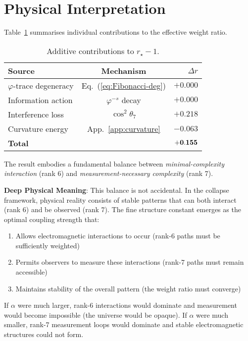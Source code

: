 \documentclass[%
 reprint,
 amsmath,amssymb,
 aps,
 prd,
 nofootinbib,      %
 longbibliography  %
]{revtex4-2}
\begin{document}
\section{Physical Interpretation}\label{sec:interpretation}

Table~\ref{tab:contributions}
summarises individual contributions to the effective
weight ratio.
\begin{table}[ht]
  \centering
  \begin{tabular}{@{}lcr@{}}
    \toprule
    Source & Mechanism & $\Delta r$ \\
    \midrule
    $\varphi$-trace degeneracy & Eq.~(\ref{eq:Fibonacci-deg}) & $+0.000$ \\
    Information action & $\varphi^{-s}$ decay & $+0.000$ \\
    Interference loss & $\cos^2\theta_7$ & $+0.218$ \\
    Curvature energy  & App.~\ref{app:curvature} & $-0.063$ \\
    \midrule
    {\bf Total} & & ${\bf +0.155}$ \\
    \bottomrule
  \end{tabular}
  \caption{Additive contributions to $r_\star-1$.}
  \label{tab:contributions}
\end{table}

The result embodies a fundamental balance between
\emph{minimal-complexity interaction} (rank 6) and
\emph{measurement-necessary complexity} (rank 7).

\textbf{Deep Physical Meaning}: This balance is not accidental. In the collapse framework, physical reality consists of stable patterns that can both interact (rank 6) and be observed (rank 7). The fine structure constant emerges as the optimal coupling strength that:

\begin{enumerate}
\item Allows electromagnetic interactions to occur (rank-6 paths must be sufficiently weighted)
\item Permits observers to measure these interactions (rank-7 paths must remain accessible)
\item Maintains stability of the overall pattern (the weight ratio must converge)
\end{enumerate}

If $\alpha$ were much larger, rank-6 interactions would dominate and measurement would become impossible (the universe would be opaque). If $\alpha$ were much smaller, rank-7 measurement loops would dominate and stable electromagnetic structures could not form.
\end{document}
